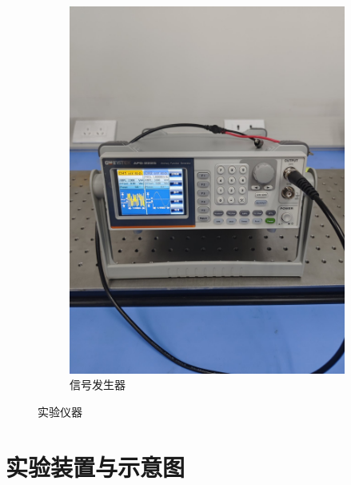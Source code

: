 \documentclass[a4paper]{report} %
\begin{document}
\begin{figure}[H]
\begin{subfigure}{0.22\textwidth}
        \includegraphics[width=\linewidth]{信号发生器.jpg}
        \caption{信号发生器}
    \end{subfigure}

    \caption{实验仪器}
\end{figure}

\section{实验装置与示意图}
\end{document}

